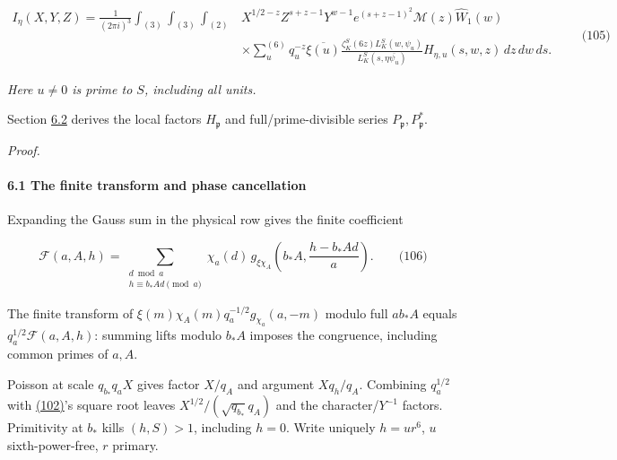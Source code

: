 \hypertarget{cf:eq:2.8}{}

\label{cf:eq:2.8}

\[
\begin{aligned}
 I_\eta(X,Y,Z)=\frac1{(2\pi i)^3}\int_{(3)}\int_{(3)}\int_{(2)}
 &X^{1/2-z}Z^{s+z-1}Y^{w-1}e^{(s+z-1)^2}
 \mathcal M(z)\widehat W_1(w)\\
 &\times\sum_u^{(6)}q_u^{-z}\overline{\xi(u)}
 \frac{\zeta_K^S(6z)L_K^S(w,\psi_u)}{L_K^S(s,\eta\overline{\psi_u})}
 H_{\eta,u}(s,w,z)\,dz\,dw\,ds.
\end{aligned}
\qquad\text{(105)}
\]

\emph{Here \(u\ne0\) is prime to \(S\), including all units.}

Section \protect\hyperlink{cf:sec:A.3}{6.2} derives the local factors \(H_{\mathfrak p}\) and full/prime-divisible series \(P_{\mathfrak p},P_{\mathfrak p}^*\).

\emph{Proof.}

\hypertarget{cf:sec:A.2}{}

\label{cf:sec:A.2}

\hypertarget{the-finite-transform-and-phase-cancellation}{%
\paragraph{6.1 The finite transform and phase cancellation}\label{the-finite-transform-and-phase-cancellation}}

Expanding the Gauss sum in the physical row gives the finite coefficient

\hypertarget{cf:eq:A.3}{}

\label{cf:eq:A.3}

\[
\mathcal F(a,A,h)=
\sum_{\substack{d\bmod a\\h\equiv b_*Ad\pmod a}}
\chi_a(d)\,g_{\xi\chi_A}\!\left(b_*A,\frac{h-b_*Ad}{a}\right).
\qquad\text{(106)}
\]

The finite transform of \(\xi(m)\chi_A(m)q_a^{-1/2}g_{\chi_a}(a,-m)\) modulo full \(ab_*A\) equals \(q_a^{1/2}\mathcal F(a,A,h)\): summing lifts modulo \(b_*A\) imposes the congruence, including common primes of \(a,A\).

Poisson at scale \(q_{b_*}q_aX\) gives factor \(X/q_A\) and argument \(Xq_h/q_A\). Combining \(q_a^{1/2}\) with \protect\hyperlink{cf:eq:2.4}{(102)}'s square root leaves \(X^{1/2}/(\sqrt{q_{b_*}}q_A)\) and the character/\(Y^{-1}\) factors. Primitivity at \(b_*\) kills \((h,S)>1\), including \(h=0\). Write uniquely \(h=ur^6\), \(u\) sixth-power-free, \(r\) primary.

